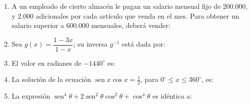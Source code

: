 \documentclass[11pt]{article}
\begin{document}
\begin{enumerate}
\item A un empleado de cierto almacén le pagan un salario mensual fijo de $200.000$, y $2.000$ adicionales por cada artículo que venda en el mes. Para obtener un salario superior a $600.000$ mensuales, deberá vender:

\item Sea $g(x) = \dfrac{1 - 3x}{1 - x}$; su inversa $g^{-1}$ está dada por:

\item El valor en radianes de $-1440^\circ$ es:
\begin{opciones}
\item $-8\pi$
\item $-16\pi$
\item $-4\pi$
\item $-24\pi$
\end{opciones}

\item La solución de la ecuación $\operatorname{sen} x \cos x = \tfrac{1}{2}$, para $0^\circ \leq x \leq 360^\circ$, es:

\item La expresión $\operatorname{sen}^4\theta + 2\operatorname{sen}^2\theta \cos^2\theta + \cos^4\theta$ es idéntica a:


\end{enumerate}
\end{document}
